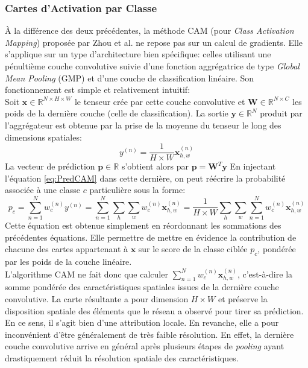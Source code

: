 \subsubsection{Cartes d'Activation par Classe}
À la différence des deux précédentes, la méthode CAM (pour \textit{Class Activation Mapping}) proposée par Zhou et al. \cite{zhouLearningDeepFeatures2016a}  ne repose pas sur un calcul de gradients. Elle s'applique sur un type d'architecture bien spécifique: celles utilisant une pénultième couche convolutive suivie d'une fonction aggrégatrice de type \textit{Global Mean Pooling} (GMP) et d'une couche de classification linéaire. Son fonctionnement est simple et relativement intuitif: \\
Soit $\mathbf{x} \in \mathbb{R}^{N \times H \times W}$ le tenseur crée par cette couche convolutive et $\mathbf{W} \in \mathbb{R}^{N\times C}$ les poids de la dernière couche (celle de classification). La sortie $\mathbf{y} \in \mathbb{R}^N$ produit par l'aggrégateur est obtenue par la prise de la moyenne du tenseur le long des dimensions spatiales:
\begin{equation}
	\label{eq:PredCAM}
	y^{(n)} = \frac{1}{H \times W} \mathbf{x}^{(n)}_{h, w}
\end{equation}
La vecteur de prédiction $\mathbf{p} \in \mathbb{R}$ s'obtient alors par $\mathbf{p} =  \mathbf{W}^T \mathbf{y} $
En injectant l'équation \ref{eq:PredCAM} dans cette dernière, on peut réécrire la probabilité associée à une classe $c$ particulière sous la forme:
\begin{equation}
	p_c = \sum_{n=1}^{N} w_{c}^{(n)} y^{(n)} = \sum_{n=1}^{N} \sum_{h} \sum_{w}  w_{c}^{(n)} \mathbf{x}^{(n)}_{h, w} = \frac{1}{H \times W} \sum_{h} \sum_{w} \sum_{n=1}^{N} w_{c}^{(n)} \mathbf{x}^{(n)}_{h, w}
\end{equation}
Cette équation est obtenue simplement en réordonnant les sommations des précédentes équations. Elle permettre de mettre en évidence la contribution de chacune des cartes appartenant à $\mathbf{x}$ sur le score de la classe ciblée $p_c$, pondérée par les poids de la couche linéaire.  \\
L'algorithme CAM ne fait donc que calculer $\sum_{n=1}^{N} w_{c}^{(n)} \mathbf{x}^{(n)}_{h, w}$, c'est-à-dire la somme pondérée des caractéristiques spatiales issues de la dernière couche convolutive. La carte résultante a pour dimension $H \times W$ et préserve la disposition spatiale des éléments que le réseau a observé pour tirer sa prédiction. En ce sens, il s'agit bien d'une attribution locale. En revanche, elle a pour inconvénient d'être généralement de très faible résolution. En effet, la dernière couche convolutive arrive en général après plusieurs étapes de \og \textit{pooling} \fg ayant drastiquement réduit la résolution spatiale des caractéristiques.

